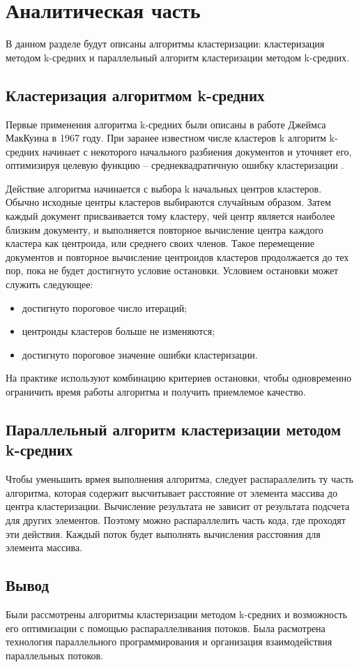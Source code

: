 \chapter{Аналитическая часть}

В данном разделе будут описаны алгоритмы кластеризации: кластеризация методом k-средних и параллельный алгоритм кластеризации методом k-средних.

\section{Кластеризация алгоритмом k-средних}

Первые применения алгоритма k-средних были описаны в работе Джеймса МакКуина в 1967 году. 
При заранее известном числе кластеров k алгоритм k-средних начинает с некоторого начального разбиения документов и уточняет его,
оптимизируя целевую функцию – среднеквадратичную ошибку кластеризации \cite{book}.


Действие алгоритма начинается с выбора k начальных центров кластеров.
Обычно исходные центры кластеров выбираются случайным образом. 
Затем каждый документ присваивается тому кластеру, чей центр является наиболее близким
документу, и выполняется повторное вычисление центра каждого кластера как центроида, или среднего своих членов. 
Такое перемещение документов и повторное вычисление центроидов кластеров продолжается до тех пор, пока не будет достигнуто условие остановки. 
Условием остановки может служить следующее: 
\begin{itemize}
	\item достигнуто пороговое число итераций;
	\item центроиды кластеров больше не изменяются;
	\item достигнуто пороговое значение ошибки кластеризации.
\end{itemize}
На практике используют комбинацию критериев остановки, чтобы одновременно ограничить время работы
алгоритма и получить приемлемое качество.



\section{ Параллельный алгоритм кластеризации методом k-средних}

Чтобы уменьшить врмея выполнения алгоритма, следует распараллелить ту часть алгоритма, которая содержит высчитывает расстояние от элемента массива до центра кластеризации.
Вычисление результата не зависит от результата подсчета для других элементов.
Поэтому можно распараллелить часть кода, где проходят эти действия.
Каждый поток будет выполнять вычисления расстояния для элемента массива.


\section{Вывод}

Были рассмотрены алгоритмы кластеризации методом k-средних и возможность его оптимизации с помощью распараллеливания потоков.
Была расмотрена технология параллельного программирования и организация взаимодействия параллельных потоков.